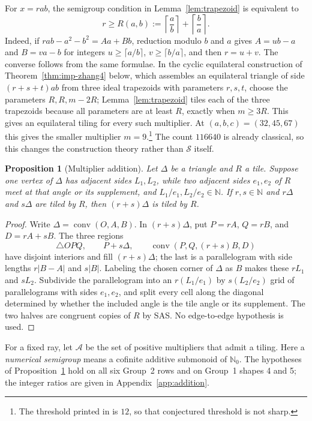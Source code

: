 \documentclass[11pt]{amsart}
\newtheorem{proposition}[theorem]{Proposition}
\theoremstyle{definition}
\theoremstyle{remark}
\newcommand{\N}{\mathbb N}
\newcommand{\Nzero}{\mathbb N_0}
\newcommand{\Sset}{\mathcal S}
\newcommand{\Aset}{\mathcal A}
\begin{document}
For $x=rab$, the semigroup condition in Lemma~\ref{lem:trapezoid} is
equivalent to
\[
 r\ge R(a,b):=\left\lceil\frac ab\right\rceil+
              \left\lceil\frac ba\right\rceil.
\]
Indeed, if $rab-a^2-b^2=Aa+Bb$, reduction modulo $b$ and $a$ gives
$A=ub-a$ and $B=va-b$ for integers
$u\ge\lceil a/b\rceil$, $v\ge\lceil b/a\rceil$, and then $r=u+v$.
The converse follows from the same formulae.  In the cyclic equilateral
construction of Theorem~\ref{thm:imp-zhang4} below, which assembles an
equilateral triangle of side $(r+s+t)ab$ from three ideal trapezoids with
parameters $r,s,t$, choose the parameters
$R,R,m-2R$; Lemma~\ref{lem:trapezoid} tiles each of the three trapezoids
because all parameters are at least $R$, exactly when $m\ge3R$.  This gives
an equilateral tiling for every such multiplier.  At
$(a,b,c)=(32,45,67)$ this gives the smaller multiplier
$m=9$.\footnote{The threshold printed in \cite[Conjecture~2]{Zhang25} is
$12$, so that conjectured threshold is not sharp.}  The count $116640$ is
already classical, so this changes the construction theory rather than
$\Sset$ itself.

\begin{proposition}[Multiplier addition]\label{prop:addition}
Let $\Delta$ be a triangle and $R$ a tile.  Suppose one vertex of $\Delta$
has adjacent sides $L_1,L_2$, while two adjacent sides $e_1,e_2$ of $R$
meet at that angle or its supplement, and
$L_1/e_1,L_2/e_2\in\N$.  If $r,s\in\N$ and $r\Delta$ and $s\Delta$ are
tiled by $R$, then
$(r+s)\Delta$ is tiled by $R$.
\end{proposition}

\begin{proof}
Write $\Delta=\operatorname{conv}(O,A,B)$.  In $(r+s)\Delta$, put
$P=rA$, $Q=rB$, and $D=rA+sB$.  The three regions
\[
 \triangle OPQ,\qquad P+s\Delta,\qquad
 \operatorname{conv}(P,Q,(r+s)B,D)
\]
have disjoint interiors and fill $(r+s)\Delta$; the last is a
parallelogram with side lengths $r|B-A|$ and $s|B|$.  Labeling the chosen
corner of $\Delta$ as $B$ makes these $rL_1$ and $sL_2$.
Subdivide the parallelogram into an
$r(L_1/e_1)$ by $s(L_2/e_2)$ grid of parallelograms with sides
$e_1,e_2$, and split every cell along the diagonal determined by whether
the included angle is the tile angle or its supplement.  The two halves are
congruent copies of $R$ by SAS.  No edge-to-edge hypothesis is used.
\end{proof}

For a fixed ray, let $\Aset$ be the set of positive multipliers that admit
a tiling.  Here a \emph{numerical semigroup} means a cofinite additive
submonoid of $\Nzero$.  The hypotheses of Proposition~\ref{prop:addition} hold on all
six Group~2 rows and on Group~1 shapes 4 and 5; the integer ratios are given
in Appendix~\ref{app:addition}.
\end{document}
